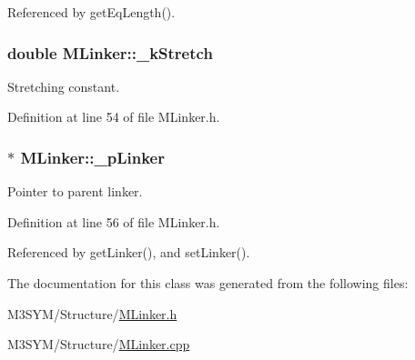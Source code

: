 Referenced by get\+Eq\+Length().

\hypertarget{classMLinker_ac42b3d84c2cd277440c052f2f80ea68c}{
\subsubsection[{\+\_\+k\+Stretch}]{\setlength{\rightskip}{0pt plus 5cm}double M\+Linker\+::\+\_\+k\+Stretch\hspace{0.3cm}{\ttfamily [private]}}}\label{classMLinker_ac42b3d84c2cd277440c052f2f80ea68c}


Stretching constant. 



Definition at line 54 of file M\+Linker.\+h.

\hypertarget{classMLinker_abf4cccf6a06de78c9856c13c903c8edd}{
\subsubsection[{\+\_\+p\+Linker}]{$\ast$ M\+Linker\+::\+\_\+p\+Linker\hspace{0.3cm}{\ttfamily [private]}}}\label{classMLinker_abf4cccf6a06de78c9856c13c903c8edd}


Pointer to parent linker. 



Definition at line 56 of file M\+Linker.\+h.



Referenced by get\+Linker(), and set\+Linker().



The documentation for this class was generated from the following files\+:\begin{DoxyCompactItemize}
\item 
M3\+S\+Y\+M/\+Structure/\hyperlink{MLinker_8h}{M\+Linker.\+h}\item 
M3\+S\+Y\+M/\+Structure/\hyperlink{MLinker_8cpp}{M\+Linker.\+cpp}\end{DoxyCompactItemize}
